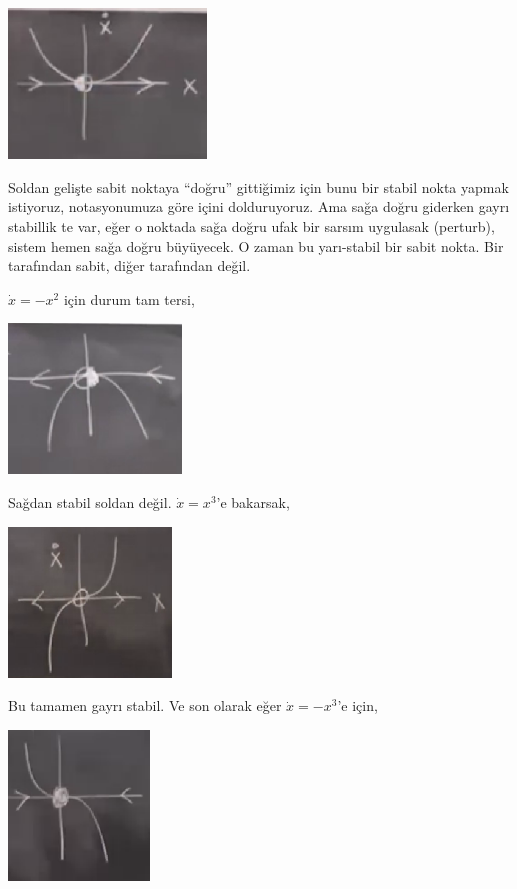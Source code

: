 \documentclass[12pt,fleqn]{article}\usepackage{../../common}
\begin{document}
\includegraphics[height=4cm]{02_03.png}

Soldan gelişte sabit noktaya ``doğru'' gittiğimiz için bunu bir stabil nokta
yapmak istiyoruz, notasyonumuza göre içini dolduruyoruz. Ama sağa doğru
giderken gayrı stabillik te var, eğer o noktada sağa doğru ufak bir sarsım
uygulasak (perturb), sistem hemen sağa doğru büyüyecek. O zaman bu yarı-stabil
bir sabit nokta. Bir tarafından sabit, diğer tarafından değil.

$\dot{x} = -x^2$ için durum tam tersi,

\includegraphics[height=4cm]{02_04.png}

Sağdan stabil soldan değil. $\dot{x} = x^3$'e bakarsak,

\includegraphics[height=4cm]{02_05.png}

Bu tamamen gayrı stabil. Ve son olarak eğer $\dot{x} = -x^3$'e için,

\includegraphics[height=4cm]{02_06.png}
\end{document}

